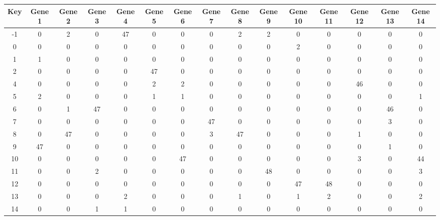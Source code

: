 \begin{tabular}{|c|c|c|c|c|c|c|c|c|c|c|c|c|c|c|}
\hline
Key & Gene 1 & Gene 2 & Gene 3 & Gene 4 & Gene 5 & Gene 6 & Gene 7 & Gene 8 & Gene 9 & Gene 10 & Gene 11 & Gene 12 & Gene 13 & Gene 14 \\
\hline
-1 & 0 & 2 & 0 & 47 & 0 & 0 & 0 & 2 & 2 & 0 & 0 & 0 & 0 & 0 \\
0 & 0 & 0 & 0 & 0 & 0 & 0 & 0 & 0 & 0 & 2 & 0 & 0 & 0 & 0 \\
1 & 1 & 0 & 0 & 0 & 0 & 0 & 0 & 0 & 0 & 0 & 0 & 0 & 0 & 0 \\
2 & 0 & 0 & 0 & 0 & 47 & 0 & 0 & 0 & 0 & 0 & 0 & 0 & 0 & 0 \\
4 & 0 & 0 & 0 & 0 & 2 & 2 & 0 & 0 & 0 & 0 & 0 & 46 & 0 & 0 \\
5 & 2 & 0 & 0 & 0 & 1 & 1 & 0 & 0 & 0 & 0 & 0 & 0 & 0 & 1 \\
6 & 0 & 1 & 47 & 0 & 0 & 0 & 0 & 0 & 0 & 0 & 0 & 0 & 46 & 0 \\
7 & 0 & 0 & 0 & 0 & 0 & 0 & 47 & 0 & 0 & 0 & 0 & 0 & 3 & 0 \\
8 & 0 & 47 & 0 & 0 & 0 & 0 & 3 & 47 & 0 & 0 & 0 & 1 & 0 & 0 \\
9 & 47 & 0 & 0 & 0 & 0 & 0 & 0 & 0 & 0 & 0 & 0 & 0 & 1 & 0 \\
10 & 0 & 0 & 0 & 0 & 0 & 47 & 0 & 0 & 0 & 0 & 0 & 3 & 0 & 44 \\
11 & 0 & 0 & 2 & 0 & 0 & 0 & 0 & 0 & 48 & 0 & 0 & 0 & 0 & 3 \\
12 & 0 & 0 & 0 & 0 & 0 & 0 & 0 & 0 & 0 & 47 & 48 & 0 & 0 & 0 \\
13 & 0 & 0 & 0 & 2 & 0 & 0 & 0 & 1 & 0 & 1 & 2 & 0 & 0 & 2 \\
14 & 0 & 0 & 1 & 1 & 0 & 0 & 0 & 0 & 0 & 0 & 0 & 0 & 0 & 0 \\
\hline
\end{tabular}